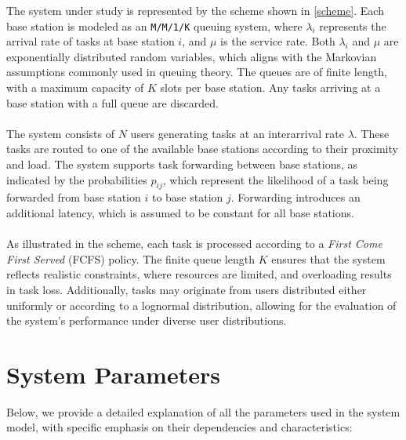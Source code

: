 \documentclass{report}
\begin{document}
The system under study is represented by the scheme shown in \autoref{scheme}. Each base station is modeled as an \texttt{M/M/1/K} queuing system, where $\lambda_i$ represents the arrival rate of tasks at base station $i$, and $\mu$ is the service rate.
Both $\lambda_i$ and $\mu$ are exponentially distributed random variables, which aligns with the Markovian assumptions commonly used in queuing theory. The queues are of finite length, with a maximum capacity of $K$ slots per base station. Any tasks arriving at a base station with a full queue are discarded.\\\\
The system consists of $N$ users generating tasks at an interarrival rate $\lambda$. These tasks are routed to one of the available base stations according to their proximity and load. The system supports task forwarding between base stations, as indicated by the probabilities $p_{ij}$, which represent the likelihood of a task being forwarded from base station $i$ to base station $j$. Forwarding introduces an additional latency, which is assumed to be constant for all base stations.\\\\
As illustrated in the scheme, each task is processed according to a \textit{First Come First Served} (FCFS) policy. The finite queue length $K$ ensures that the system reflects realistic constraints, where resources are limited, and overloading results in task loss. Additionally, tasks may originate from users distributed either uniformly or according to a lognormal distribution, allowing for the evaluation of the system's performance under diverse user distributions.

\section{System Parameters}
Below, we provide a detailed explanation of all the parameters used in the system model, with specific emphasis on their dependencies and characteristics:
\end{document}
